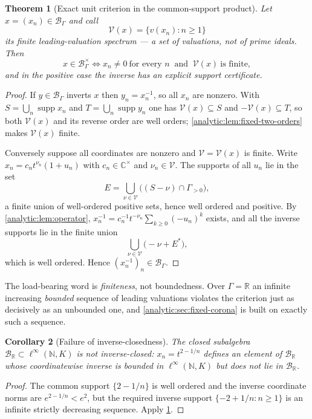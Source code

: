 \documentclass[11pt,letterpaper]{article}
\newtheorem{theorem}{Theorem}[section]
\newtheorem{corollary}[theorem]{Corollary}
\theoremstyle{definition}
\theoremstyle{remark}
\newcommand{\C}{\mathbb C}
\newcommand{\R}{\mathbb R}
\newcommand{\N}{\mathbb N}
\newcommand{\BB}{\mathcal B}
\newcommand{\supp}{\operatorname{supp}}
\numberwithin{equation}{section}
\begin{document}
\begin{theorem}[Exact unit criterion in the common-support product]
\label{analytic:thm:fixed-units}
Let $x=(x_n)\in\BB_\Gamma$ and call
\begin{equation}\label{analytic:eq:fixed-V}
 \mathcal V(x)=\{v(x_n):n\ge1\}
\end{equation}
its \emph{finite leading-valuation spectrum} --- a set of valuations, not
of prime ideals. Then
\[
 x\in\BB_\Gamma^\times
 \iff
 x_n\ne0\ \text{for every }n\ \text{ and }\ \mathcal V(x)\ \text{is finite},
\]
and in the positive case the inverse has an explicit support certificate.
\end{theorem}
\begin{proof}
If $y\in\BB_\Gamma$ inverts $x$ then $y_n=x_n^{-1}$, so all $x_n$ are
nonzero. With $S=\bigcup_n\supp x_n$ and $T=\bigcup_n\supp y_n$ one has
$\mathcal V(x)\subseteq S$ and $-\mathcal V(x)\subseteq T$, so both $\mathcal V(x)$ and its reverse
order are well orders; \cref{analytic:lem:fixed-two-orders} makes $\mathcal V(x)$
finite.

Conversely suppose all coordinates are nonzero and $\mathcal V=\mathcal V(x)$ is finite.
Write $x_n=c_nt^{\nu_n}(1+u_n)$ with $c_n\in\C^\times$ and
$\nu_n\in\mathcal V$. The supports of all $u_n$ lie in the set
\begin{equation}\label{analytic:eq:fixed-Efinite}
 E=\bigcup_{\nu\in\mathcal V}\bigl((S-\nu)\cap\Gamma_{>0}\bigr),
\end{equation}
a finite union of well-ordered positive sets, hence well ordered and
positive. By \cref{analytic:lem:operator},
$x_n^{-1}=c_n^{-1}t^{-\nu_n}\sum_{k\ge0}(-u_n)^k$ exists, and all the
inverse supports lie in the finite union
\begin{equation}\label{analytic:eq:fixed-inverse-support}
 \bigcup_{\nu\in\mathcal V}\bigl(-\nu+E^*\bigr),
\end{equation}
which is well ordered. Hence $(x_n^{-1})_n\in\BB_\Gamma$.
\end{proof}

The load-bearing word is \emph{finiteness}, not boundedness. Over
$\Gamma=\R$ an infinite increasing \emph{bounded} sequence of leading
valuations violates the criterion just as decisively as an unbounded one,
and \cref{analytic:sec:fixed-corona} is built on exactly such a sequence.

\begin{corollary}[Failure of inverse-closedness]
\label{analytic:cor:fixed-inverseclosed}
The closed subalgebra $\BB_\R\subset\ell^\infty(\N,K)$ is not
inverse-closed: $x_n=t^{2-1/n}$ defines an element of $\BB_\R$ whose
coordinatewise inverse is bounded in $\ell^\infty(\N,K)$ but does not lie
in $\BB_\R$.
\end{corollary}
\begin{proof}
The common support $\{2-1/n\}$ is well ordered and the inverse coordinate
norms are $e^{2-1/n}<e^2$, but the required inverse support
$\{-2+1/n:n\ge1\}$ is an infinite strictly decreasing sequence. Apply
\cref{analytic:thm:fixed-units}.
\end{proof}
\end{document}
